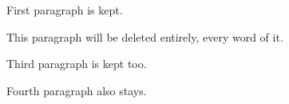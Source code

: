 \documentclass{article}
\begin{document}
First paragraph is kept.

This paragraph will be deleted entirely, every word of it.

Third paragraph is kept too.

Fourth paragraph also stays.
\end{document}
